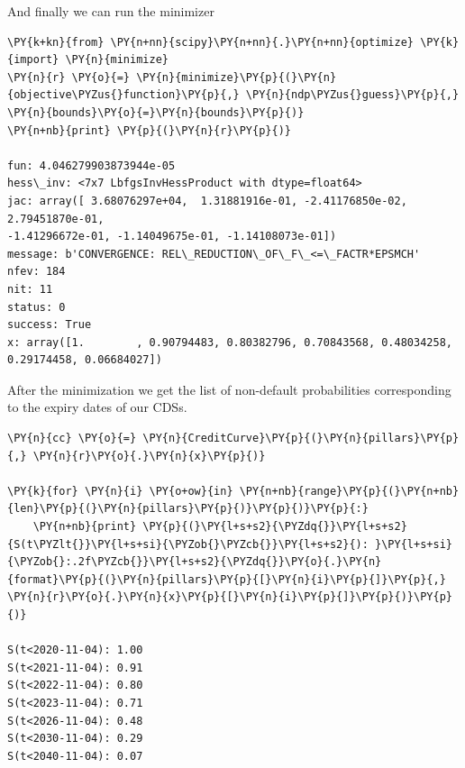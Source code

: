 And finally we can run the minimizer
\begin{tcolorbox}[breakable, size=fbox, boxrule=1pt, pad at break*=1mm,colback=cellbackground, colframe=cellborder]
\begin{Verbatim}[commandchars=\\\{\}]
\PY{k+kn}{from} \PY{n+nn}{scipy}\PY{n+nn}{.}\PY{n+nn}{optimize} \PY{k}{import} \PY{n}{minimize}
\PY{n}{r} \PY{o}{=} \PY{n}{minimize}\PY{p}{(}\PY{n}{objective\PYZus{}function}\PY{p}{,} \PY{n}{ndp\PYZus{}guess}\PY{p}{,} \PY{n}{bounds}\PY{o}{=}\PY{n}{bounds}\PY{p}{)}
\PY{n+nb}{print} \PY{p}{(}\PY{n}{r}\PY{p}{)}

fun: 4.046279903873944e-05
hess\_inv: <7x7 LbfgsInvHessProduct with dtype=float64>
jac: array([ 3.68076297e+04,  1.31881916e-01, -2.41176850e-02,
2.79451870e-01,
-1.41296672e-01, -1.14049675e-01, -1.14108073e-01])
message: b'CONVERGENCE: REL\_REDUCTION\_OF\_F\_<=\_FACTR*EPSMCH'
nfev: 184
nit: 11
status: 0
success: True
x: array([1.        , 0.90794483, 0.80382796, 0.70843568, 0.48034258,
0.29174458, 0.06684027])
\end{Verbatim}
\end{tcolorbox}

After the minimization we get the list of non-default probabilities corresponding to the expiry dates of our CDSs.

\begin{tcolorbox}[breakable, size=fbox, boxrule=1pt, pad at break*=1mm,colback=cellbackground, colframe=cellborder]
\begin{Verbatim}[commandchars=\\\{\}]
\PY{n}{cc} \PY{o}{=} \PY{n}{CreditCurve}\PY{p}{(}\PY{n}{pillars}\PY{p}{,} \PY{n}{r}\PY{o}{.}\PY{n}{x}\PY{p}{)}
	
\PY{k}{for} \PY{n}{i} \PY{o+ow}{in} \PY{n+nb}{range}\PY{p}{(}\PY{n+nb}{len}\PY{p}{(}\PY{n}{pillars}\PY{p}{)}\PY{p}{)}\PY{p}{:}
    \PY{n+nb}{print} \PY{p}{(}\PY{l+s+s2}{\PYZdq{}}\PY{l+s+s2}{S(t\PYZlt{}}\PY{l+s+si}{\PYZob{}\PYZcb{}}\PY{l+s+s2}{): }\PY{l+s+si}{\PYZob{}:.2f\PYZcb{}}\PY{l+s+s2}{\PYZdq{}}\PY{o}{.}\PY{n}{format}\PY{p}{(}\PY{n}{pillars}\PY{p}{[}\PY{n}{i}\PY{p}{]}\PY{p}{,} \PY{n}{r}\PY{o}{.}\PY{n}{x}\PY{p}{[}\PY{n}{i}\PY{p}{]}\PY{p}{)}\PY{p}{)}

S(t<2020-11-04): 1.00
S(t<2021-11-04): 0.91
S(t<2022-11-04): 0.80
S(t<2023-11-04): 0.71
S(t<2026-11-04): 0.48
S(t<2030-11-04): 0.29
S(t<2040-11-04): 0.07
\end{Verbatim}
\end{tcolorbox}


